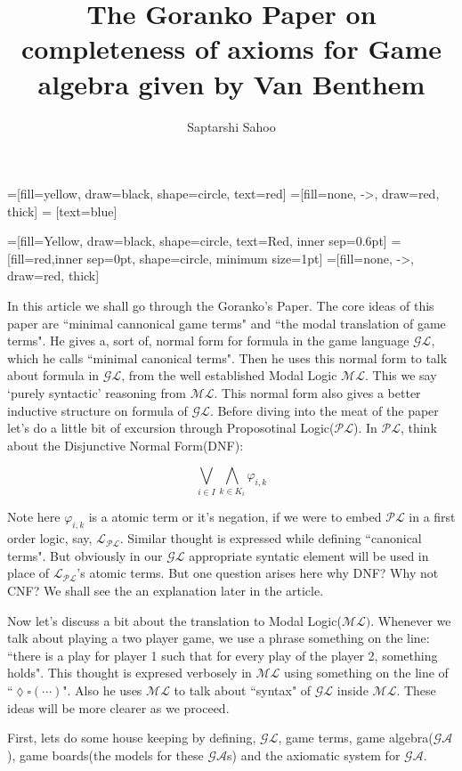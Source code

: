 \documentclass[10pt]{article}
\title{The \textbf{Goranko Paper} on completeness of axioms for Game algebra given by Van Benthem}
\author{Saptarshi Sahoo}
\renewcommand{\phi}{\varphi}
\newcommand{\move}{\lozenge}
\newcommand{\Move}{\square}
\newcommand{\pl}{\mathcal{PL}}
\newcommand{\gl}{\mathcal{GL}}
\newcommand{\ml}{\mathcal{ML}}
\newcommand{\ga}{\mathcal{GA}}
\renewcommand{\L}{\mathcal{L}}
\begin{document}
	\maketitle
	
	=[fill=yellow, draw=black, shape=circle, text=red]
	=[fill=none, ->, draw=red, thick]
	 = [text=blue]
	
	=[fill=Yellow, draw=black, shape=circle, text=Red, inner sep=0.6pt]
	 = [fill=red,inner sep=0pt, shape=circle, minimum size=1pt]
	=[fill=none, ->, draw=red, thick]
	
	In this article we shall go through the Goranko's Paper. The core ideas of this paper are ``minimal cannonical game terms" and ``the modal translation of game terms". He gives a, sort of, normal form for formula in the game language $\gl$, which he calls ``minimal canonical terms". Then he uses this normal form to talk about formula in $\gl$, from the well established Modal Logic $\ml$. This we say `purely syntactic' reasoning from $\ml$. This normal form also gives a better inductive structure on formula of $\gl$. Before diving into the meat of the paper let's do a little bit of excursion through Proposotinal Logic($\pl$). In $\pl$, think about the Disjunctive Normal Form(DNF):
	
	\begin{equation}
	\bigvee_{i\in I} \bigwedge_{k \in K_i} \phi_{i,k}
	\end{equation}
	
	Note here $\phi_{i,k}$ is a atomic term or it's negation, if we were to embed $\pl$ in a first order logic, say, $\L_{\pl}$. Similar thought is expressed while defining ``canonical terms". But obviously in our $\gl$ appropriate syntatic element will be used in place of $\L_\pl$'s atomic terms. But one question arises here why DNF? Why not CNF? We shall see the an explanation later in the article.
	
	Now let's discuss a bit about the translation to Modal Logic($\ml)$. Whenever we talk about playing a two player game, we use a phrase something on the line: ``there is a play for player 1 such that for every play of the player 2, something holds". This thought is expresed verbosely in $\ml$ using something on the line of ``$\move\Move(\cdots)$". Also he uses $\ml$ to talk about ``syntax" of $\gl$ inside $\ml$. These ideas will be more clearer as we proceed.
	
	First, lets do some house keeping by defining, $\gl$, game terms, game algebra($\ga$), game boards(the models for these $\ga$s) and the axiomatic system for $\ga$. 
	
\end{document}

